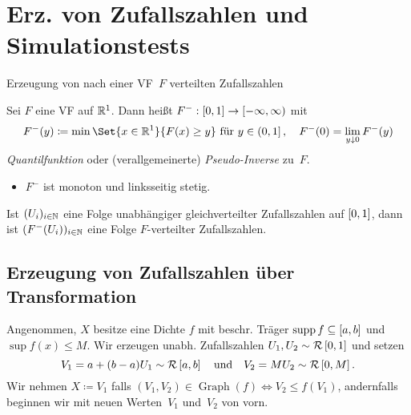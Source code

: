 \documentclass{cheat-sheet}
\newcommand{\Uniform}{\mathcal{R}} %
\DeclareMathOperator{\Graph}{Graph} %
\begin{document}
\section{Erz. von Zufallszahlen und Simulationstests}


\begin{ziel}
  Erzeugung von nach einer VF~$F$ verteilten Zufallszahlen
\end{ziel}

\begin{defn}
  Sei $F$ eine VF auf $\mathbb{R}^1$.
  Dann heißt $F^{-} : \left[ 0, 1 \right] \to \left[ -\infty, \infty \right)$ mit
  \[
    F^{-}(y) \coloneqq \min \Set{x \in \R^1}{F(x) \geq y}
    \text{ für } y \in \ocinterval{0}{1}, \quad
    F^{-}(0) = \lim_{y \downarrow 0} F^{-}(y)
  \]
   \emph{Quantilfunktion} oder (verallgemeinerte) \emph{Pseudo-Inverse} zu~$F$.
\end{defn}

\begin{eign}
  \begin{itemize}
    \item $F^{-}$ ist monoton und linksseitig stetig.
    \miniitem{0.48 \linewidth}{$U \sim \Uniform \cinterval{0}{1}$ $\implies$ $F^{-}(U) \sim F$}
  \end{itemize}
\end{eign}

\begin{verf}
  Ist $(U_i)_{i \in \mathbb{N}}$ eine Folge unabhängiger gleichverteilter Zufallszahlen auf $\left[ 0, 1 \right]$, dann ist $(F^{-}(U_i))_{i \in \mathbb{N}}$ eine Folge $F$-verteilter Zufallszahlen.
\end{verf}


\subsection{Erzeugung von Zufallszahlen über Transformation}

\begin{verf}
  Angenommen, $X$ besitze eine Dichte $f$ mit beschr. Träger $\operatorname{supp} f \subseteq \left[ a, b \right]$ und $\sup f(x) \leq M$.
  Wir erzeugen unabh. Zufallszahlen $U_1, U_2 \sim \Uniform \cinterval{0}{1}$ und setzen
  \[
    V_1 = a + (b-a) U_1 \sim \Uniform \cinterval{a}{b}
    \quad \text{und} \quad
    V_2 = M U_2 \sim \Uniform \cinterval{0}{M}.
  \]
  Wir nehmen $X \coloneqq V_1$ falls $(V_1, V_2) \in \Graph(f) \iff V_2 \leq f(V_1)$, andernfalls beginnen wir mit neuen Werten~$V_1$ und~$V_2$ von vorn.
\end{verf}
\end{document}
